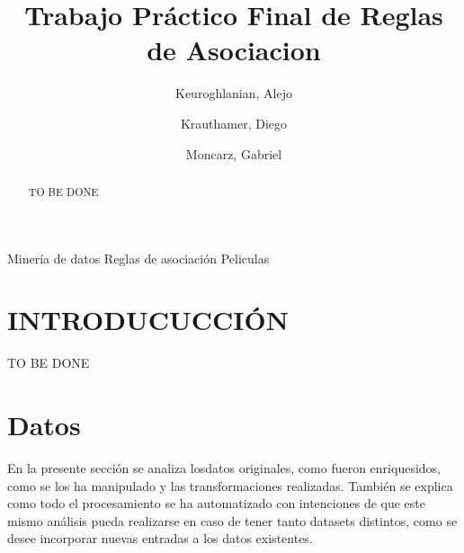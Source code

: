 \documentclass[journal]{IEEEtran}
\begin{document}
\title{Trabajo Práctico Final de Reglas de Asociacion}
\author{
	Keuroghlanian, Alejo \\
	\and
	Krauthamer, Diego \\
	\and
	Moncarz, Gabriel}
\maketitle %

\begin{abstract}
TO BE DONE
\end{abstract}

\begin{IEEEkeywords}
Minería de datos
Reglas de asociación
Peliculas
\end{IEEEkeywords}

\section{INTRODUCUCCIÓN}

TO BE DONE





\section{Datos}
En la presente sección se analiza losdatos originales, como fueron enriquesidos,
como se los ha manipulado y las transformaciones realizadas. También se explica como
todo el procesamiento se ha automatizado con intenciones de que este mismo análisis 
pueda realizarse en caso de tener tanto datasets distintos, como se desee incorporar
nuevas entradas a los datos existentes.
\end{document}
